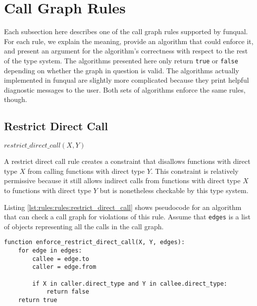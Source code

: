 \section{Call Graph Rules}\label{sec:rules:rules}


Each subsection here describes one of the call graph rules supported by funqual.  For each rule, we explain the meaning, provide an algorithm that could enforce it, and present an argument for the algorithm's correctness with respect to the rest of the type system.  The algorithms presented here only return \lstinline{true} or \lstinline{false} depending on whether the graph in question is valid.  The algorithms actually implemented in funqual are slightly more complicated because they print helpful diagnostic messages to the user.  Both sets of algorithms enforce the same rules, though.  

\subsection{Restrict Direct Call}

\begin{center}
    $restrict\_direct\_call(X, Y)$
\end{center}

A restrict direct call rule creates a constraint that disallows functions with direct type $X$ from calling functions with direct type $Y$.  This constraint is relatively permissive because it still allows indirect calls from functions with direct type $X$ to functions with direct type $Y$ but is nonetheless checkable by this type system.

Listing \ref{lst:rules:rules:restrict_direct_call} shows pseudocode for an algorithm that can check a call graph for violations of this rule.  Assume that \lstinline{edges} is a list of objects representing all the calls in the call graph.  

\noindent\begin{minipage}[t]{\linewidth}
\begin{lstlisting}[caption={Pseudocode for an algorithm that can check a $restrict\_direct\_call$ constraint.  This algorithm returns \lstinline{true} if the call graph respects the constraint and \lstinline{false} if the call graph violates it.},label={lst:rules:rules:restrict_direct_call}]
function enforce_restrict_direct_call(X, Y, edges):
    for edge in edges:
        callee = edge.to
        caller = edge.from

        if X in caller.direct_type and Y in callee.direct_type:
            return false
    return true
\end{lstlisting}
\end{minipage}

